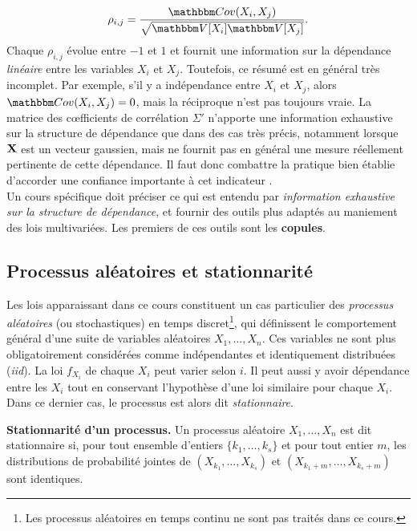 \begin{eqnarray}
\rho_{i,j} = \frac{\Cov(X_i,X_j)}{\sqrt{\Var[X_i]\Var[X_j]}}. \label{correlation.formula}
\end{eqnarray}
Chaque $\rho_{i,j}$ \'evolue entre $-1$ et $1$ et fournit une information sur la d\'ependance {\it lin\'eaire} entre les variables $X_i$ et $X_j$. 
Toutefois, ce r\'esum\'e est en g\'en\'eral tr\`es incomplet. Par exemple, s'il y a ind\'ependance entre $X_i$ et $X_j$,  alors $\Cov(X_i,X_j)=0$, mais la r\'eciproque n'est pas toujours vraie. %
La matrice des c{\oe}fficients de corr\'elation $\Sigma'$ n'apporte une information exhaustive sur la structure de d\'ependance que dans des cas tr\`es pr\'ecis, notamment lorsque ${\bf X}$ est un vecteur gaussien, mais ne fournit pas en g\'en\'eral une mesure r\'eellement pertinente de cette d\'ependance. Il faut donc combattre la pratique bien \'etablie d'accorder une confiance importante \`a cet indicateur \cite{Xie2016}. \\

Un cours spécifique doit pr\'eciser ce qui est entendu par {\it information exhaustive sur la structure de d\'ependance}, et fournir des outils plus adapt\'es au maniement des lois multivari\'ees. Les premiers de ces outils sont les {\bf copules}. 

\subsection{Processus al\'eatoires et stationnarit\'e}\label{processus}

Les lois apparaissant dans ce cours constituent un cas particulier des {\it processus al\'eatoires} (ou stochastiques) en temps discret\footnote{Les processus al\'eatoires en temps continu ne sont pas trait\'es dans ce cours.}, qui d\'efinissent le comportement g\'en\'eral d'une suite de variables al\'eatoires $X_1,\ldots,X_n$. Ces variables ne sont plus obligatoirement consid\'er\'ees comme ind\'ependantes et identiquement distribu\'ees ({\it iid}). La loi $f_{X_i}$ de chaque $X_i$ peut varier selon $i$. Il peut aussi y avoir d\'ependance entre les $X_i$ tout en conservant l'hypoth\`ese d'une loi similaire pour chaque $X_i$. Dans ce dernier cas, le processus est alors dit {\it stationnaire}.   \\

\begin{definition}{\bf Stationnarit\'e d'un processus.}\label{stationnarite}
Un processus al\'eatoire $X_1,\ldots,X_n$ est dit stationnaire si, pour tout ensemble d'entiers $\{k_1,\ldots,k_s\}$ et pour tout entier $m$, les distributions de probabilit\'e jointes de $(X_{k_1},\ldots,X_{k_s})$ et $(X_{k_1+m},\ldots, X_{k_s+m})$ sont identiques. \\
\end{definition}

